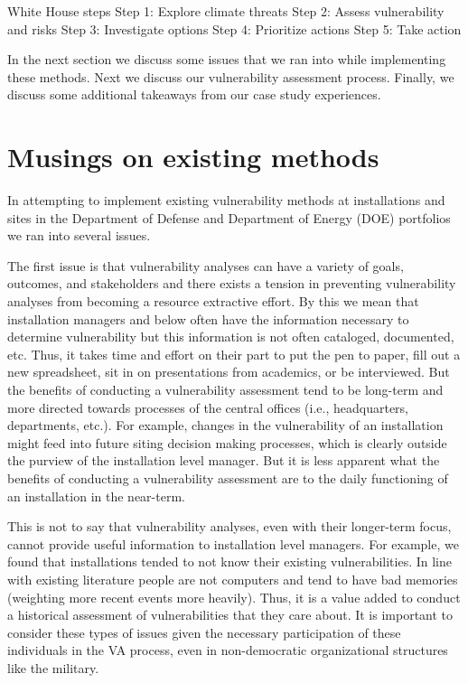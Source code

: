 \documentclass[10pt]{amsart}
\begin{document}
White House steps
Step 1: Explore climate threats
Step 2: Assess vulnerability and risks
Step 3: Investigate options
Step 4: Prioritize actions
Step 5: Take action


In the next section we discuss some issues that we ran into while implementing these methods.
Next we discuss our vulnerability assessment process.
Finally, we discuss some additional takeaways from our case study experiences.

\section{Musings on existing methods}
In attempting to implement existing vulnerability methods at installations and sites in the Department of Defense and Department of Energy (DOE) portfolios we ran into several issues.

The first issue is that vulnerability analyses can have a variety of goals, outcomes, and stakeholders and there exists a tension in preventing vulnerability analyses from becoming a resource extractive effort.
By this we mean that installation managers and below often have the information necessary to determine vulnerability but this information is not often cataloged, documented, etc.
Thus, it takes time and effort on their part to put the pen to paper, fill out a new spreadsheet, sit in on presentations from academics, or be interviewed.
But the benefits of conducting a vulnerability assessment tend to be long-term and more directed towards processes of the central offices (i.e., headquarters, departments, etc.).
For example, changes in the vulnerability of an installation might feed into future siting decision making processes, which is clearly outside the purview of the installation level manager.
But it is less apparent what the benefits of conducting a vulnerability assessment are to the daily functioning of an installation in the near-term.

This is not to say that vulnerability analyses, even with their longer-term focus, cannot provide useful information to installation level managers.
For example, we found that installations tended to not know their existing vulnerabilities.
In line with existing literature people are not computers and tend to have bad memories (weighting more recent events more heavily).
Thus, it is a value added to conduct a historical assessment of vulnerabilities that they care about.
It is important to consider these types of issues given the necessary participation of these individuals in the VA process, even in non-democratic organizational structures like the military. 
\end{document}
